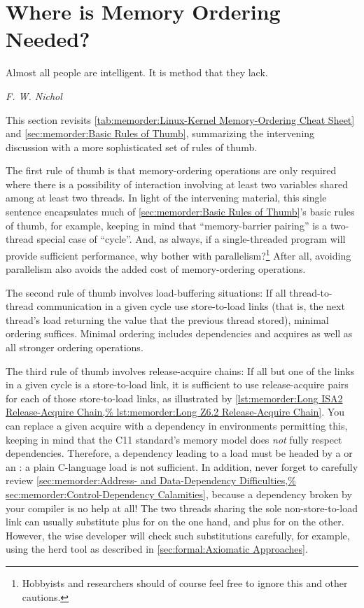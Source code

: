 \section{Where is Memory Ordering Needed?}
\label{sec:memorder:Where is Memory Ordering Needed?}
%
\epigraph{Almost all people are intelligent.
	  It is method that they lack.}
	 {\emph{F. W. Nichol}}

This section revisits
\cref{tab:memorder:Linux-Kernel Memory-Ordering Cheat Sheet}
and \cref{sec:memorder:Basic Rules of Thumb},
summarizing the intervening discussion with a more sophisticated
set of rules of thumb.

The first rule of thumb is that memory-ordering operations are only
required where there is a possibility of interaction involving at least
two variables shared among at least two threads.
In light of the intervening material, this single sentence encapsulates much of
\cref{sec:memorder:Basic Rules of Thumb}'s basic rules of thumb,
for example, keeping in mind that ``memory-barrier pairing'' is a
two-thread special case of ``cycle''.
And, as always, if a single-threaded program will provide sufficient
performance, why bother with parallelism?\footnote{
	Hobbyists and researchers should of course feel free to ignore
	this and other cautions.}
After all, avoiding parallelism also avoids the added cost of
memory-ordering operations.

The second rule of thumb involves load-buffering situations:
If all thread-to-thread communication in a given cycle use store-to-load links
(that is, the next thread's load returning the value that the previous thread
stored), minimal ordering suffices.
Minimal ordering includes dependencies and acquires as well as all stronger
ordering operations.

The third rule of thumb involves release-acquire chains:
If all but one of the links in a given cycle is a store-to-load
link, it is sufficient to use release-acquire pairs for each of
those store-to-load links, as illustrated by
\cref{lst:memorder:Long ISA2 Release-Acquire Chain,%
lst:memorder:Long Z6.2 Release-Acquire Chain}.
You can replace a given acquire with a dependency in environments permitting
this, keeping in mind that the C11 standard's memory model does \emph{not}
fully respect dependencies.
Therefore, a dependency leading to a load must be headed by
a  or an :
a plain C-language load is not sufficient.
In addition, never forget to carefully review
\cref{sec:memorder:Address- and Data-Dependency Difficulties,%
sec:memorder:Control-Dependency Calamities}, because
a dependency broken by your compiler is no help at all!
The two threads sharing the sole non-store-to-load link can
usually substitute  plus  for
 on the one hand,
and  plus  for 
on the other.
However, the wise developer will check such substitutions carefully,
for example, using the herd tool as described in
\cref{sec:formal:Axiomatic Approaches}.

